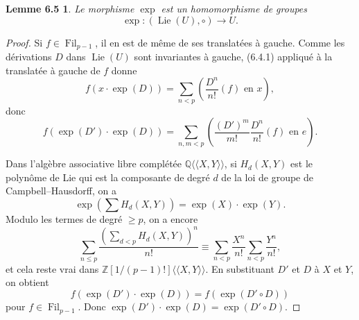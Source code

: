 \documentclass[11pt]{article}
\newcommand{\Lie}{\operatorname{Lie}}
\providecommand{\Fil}{\operatorname{Fil}}
\newtheorem*{lemme65}{Lemme 6.5}
\begin{document}
\begin{lemme65}
Le morphisme \(\exp\) est un homomorphisme de groupes
\begin{equation}
  \exp:(\Lie(U),\circ)\longrightarrow U.
  \tag{6.5.1}
\end{equation}
\end{lemme65}

\begin{proof}
Si \(f\in\Fil_{p-1}\), il en est de même de ses translatées à gauche. Comme les dérivations \(D\)
dans \(\Lie(U)\) sont invariantes à gauche, (6.4.1) appliqué à la translatée à gauche de \(f\) donne
\begin{equation}
  f(x\cdot\exp(D))=\sum_{n<p}\left(\frac{D^n}{n!}(f)\text{ en }x\right),
  \tag{6.5.2}
\end{equation}
donc
\begin{equation}
  f(\exp(D')\cdot\exp(D))=
  \sum_{n,m<p}\left(\frac{(D')^m}{m!}\frac{D^n}{n!}(f)\text{ en }e\right).
  \tag{6.5.3}
\end{equation}

Dans l'algèbre associative libre complétée \(\mathbb Q\langle\!\langle X,Y\rangle\!\rangle\), si
\(H_d(X,Y)\) est le polynôme de Lie qui est la composante de degré \(d\) de la loi de groupe de
Campbell--Hausdorff, on a
\begin{equation}
  \exp\left(\sum H_d(X,Y)\right)=\exp(X)\cdot\exp(Y).
  \tag{6.5.4}
\end{equation}
Modulo les termes de degré \(\ge p\), on a encore
\begin{equation}
  \sum_{n\le p}\frac{\left(\sum_{d<p}H_d(X,Y)\right)^n}{n!}
  \equiv
  \sum_{n<p}\frac{X^n}{n!}\sum_{n<p}\frac{Y^n}{n!},
  \tag{6.5.5}
\end{equation}
et cela reste vrai dans \(\mathbb Z[1/(p-1)!]\langle\!\langle X,Y\rangle\!\rangle\). En substituant
\(D'\) et \(D\) à \(X\) et \(Y\), on obtient
\begin{equation}
  f(\exp(D')\cdot\exp(D))=f(\exp(D'\circ D))
  \tag{6.5.6}
\end{equation}
pour \(f\in\Fil_{p-1}\). Donc \(\exp(D')\cdot\exp(D)=\exp(D'\circ D)\).


\end{proof}
\end{document}
